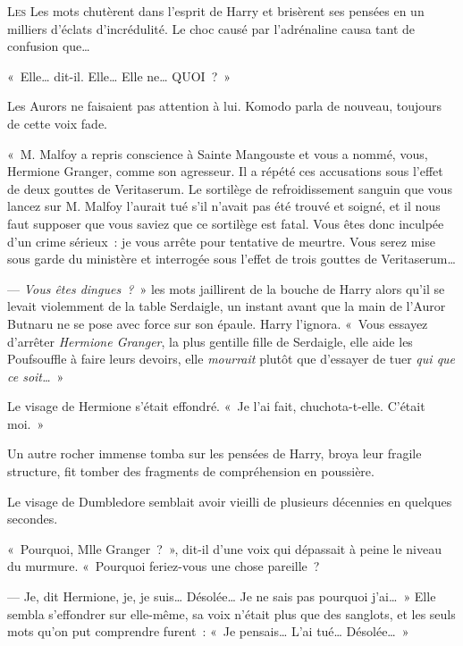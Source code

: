 
\lettrine{L}{es} Les mots chutèrent dans l'esprit de Harry et brisèrent ses pensées en un milliers d'éclats d'incrédulité. Le choc causé par l'adrénaline causa tant de confusion que…

«~Elle… dit-il. Elle… Elle ne… QUOI~?~»

Les Aurors ne faisaient pas attention à lui. Komodo parla de nouveau, toujours de cette voix fade.

«~M. Malfoy a repris conscience à Sainte Mangouste et vous a nommé, vous, Hermione Granger, comme son agresseur. Il a répété ces accusations sous l'effet de deux gouttes de Veritaserum. Le sortilège de refroidissement sanguin que vous lancez sur M. Malfoy l'aurait tué s'il n'avait pas été trouvé et soigné, et il nous faut supposer que vous saviez que ce sortilège est fatal. Vous êtes donc inculpée d'un crime sérieux~: je vous arrête pour tentative de meurtre. Vous serez mise sous garde du ministère et interrogée sous l'effet de trois gouttes de Veritaserum…

--- \emph{Vous êtes dingues~?}~» les mots jaillirent de la bouche de Harry alors qu'il se levait violemment de la table Serdaigle, un instant avant que la main de l'Auror Butnaru ne se pose avec force sur son épaule. Harry l'ignora. «~Vous essayez d'arrêter \emph{Hermione Granger}, la plus gentille fille de Serdaigle, elle aide les Poufsouffle à faire leurs devoirs, elle \emph{mourrait} plutôt que d'essayer de tuer \emph{qui que ce soit…}~»

Le visage de Hermione s'était effondré. «~Je l'ai fait, chuchota-t-elle. C'était moi.~»

Un autre rocher immense tomba sur les pensées de Harry, broya leur fragile structure, fit tomber des fragments de compréhension en poussière.

Le visage de Dumbledore semblait avoir vieilli de plusieurs décennies en quelques secondes.

«~Pourquoi, Mlle Granger~?~», dit-il d'une voix qui dépassait à peine le niveau du murmure. «~Pourquoi feriez-vous une chose pareille~?

--- Je, dit Hermione, je, je suis… Désolée… Je ne sais pas pourquoi j'ai…~» Elle sembla s'effondrer sur elle-même, sa voix n'était plus que des sanglots, et les seuls mots qu'on put comprendre furent~: «~Je pensais… L'ai tué… Désolée…~»


